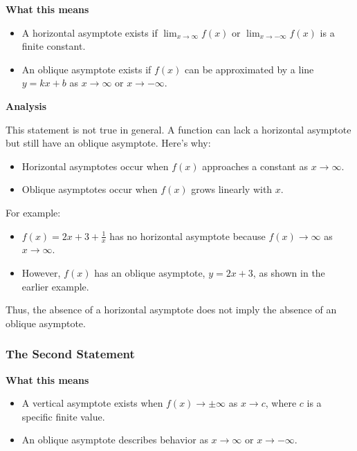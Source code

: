 \documentclass[a4paper,12pt]{article}
\begin{document}
\textbf{What this means}

\begin{itemize}
\item 
A horizontal asymptote exists if \( \lim_{x \to \infty} f(x) \) or \( \lim_{x \to -\infty} f(x) \) is a finite constant.

\item 
An oblique asymptote exists if \( f(x) \) can be approximated by a line \( y = kx + b \) as \( x \to \infty \) or \( x \to -\infty \).

\end{itemize}

\textbf{Analysis}

This statement is not true in general. A function can lack a horizontal asymptote but still have an oblique asymptote. Here’s why:
\begin{itemize}
\item 
Horizontal asymptotes occur when \( f(x) \) approaches a constant as \( x \to \infty \).

\item 
Oblique asymptotes occur when \( f(x) \) grows linearly with \( x \).

\end{itemize}

For example:
\begin{itemize}
\item 
\( f(x) = 2x + 3 + \frac{1}{x} \) has no horizontal asymptote because \( f(x) \to \infty \) as \( x \to \infty \).

\item 
However, \( f(x) \) has an oblique asymptote, \( y = 2x + 3 \), as shown in the earlier example.

\end{itemize}

Thus, the absence of a horizontal asymptote does not imply the absence of an oblique asymptote.

\hrulefill

\subsubsection{The Second Statement}

\textbf{What this means}

\begin{itemize}
\item 
A vertical asymptote exists when \( f(x) \to \pm \infty \) as \( x \to c \), where \( c \) is a specific finite value.

\item 
An oblique asymptote describes behavior as \( x \to \infty \) or \( x \to -\infty \).

\end{itemize}
\end{document}
